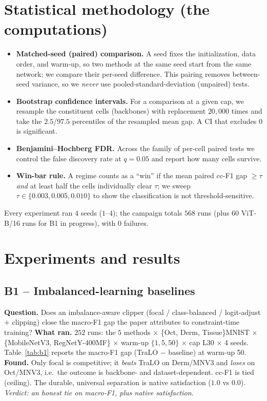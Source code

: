 \documentclass[11pt,a4paper]{article}
\begin{document}
\section{Statistical methodology (the computations)}
\begin{itemize}
\item \textbf{Matched-seed (paired) comparison.} A seed fixes the initialization, data order, and warm-up, so
two methods at the same seed start from the same network; we compare their per-seed difference. This pairing
removes between-seed variance, so we \emph{never} use pooled-standard-deviation (unpaired) tests.
\item \textbf{Bootstrap confidence intervals.} For a comparison at a given cap, we resample the constituent
cells (backbones) with replacement $20{,}000$ times and take the $2.5$/$97.5$ percentiles of the resampled mean
gap. A CI that excludes $0$ is significant.
\item \textbf{Benjamini--Hochberg FDR.} Across the family of per-cell paired tests we control the false
discovery rate at $q=0.05$ and report how many cells survive.
\item \textbf{Win-bar rule.} A regime counts as a ``win'' if the mean paired cc-F1 gap $\ge \tau$ \emph{and} at
least half the cells individually clear $\tau$; we sweep $\tau\in\{0.003,0.005,0.010\}$ to show the
classification is not threshold-sensitive.
\end{itemize}
Every experiment ran $4$ seeds ($1$--$4$); the campaign totals $568$ runs (plus $60$ ViT-B/16 runs for B1 in
progress), with $0$ failures.

\section{Experiments and results}

\subsection{B1 -- Imbalanced-learning baselines}
\textbf{Question.} Does an imbalance-aware clipper (focal / class-balanced / logit-adjust $+$ clipping) close
the macro-F1 gap the paper attributes to constraint-time training? \textbf{What ran.} $252$ runs: the $5$
methods $\times$ \{Oct, Derm, Tissue\}MNIST $\times$ \{MobileNetV3, RegNetY-400MF\} $\times$ warm-up
$\{1,5,50\}$ $\times$ cap L30 $\times$ 4 seeds. Table~\ref{tab:b1} reports the macro-F1 gap
(TraLO $-$ baseline) at warm-up 50. \textbf{Found.} Only focal is competitive; it \emph{beats} TraLO on
Derm/MNV3 and \emph{loses} on Oct/MNV3, i.e.\ the outcome is backbone- and dataset-dependent. cc-F1 is tied
(ceiling). The durable, universal separation is native satisfaction ($1.0$ vs $0.0$). \emph{Verdict: an honest
tie on macro-F1, plus native satisfaction.}
\end{document}
